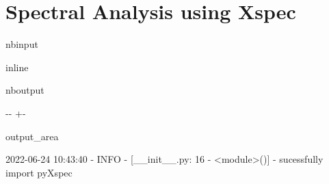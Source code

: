 \documentclass[letterpaper,10pt,english]{sphinxmanual}
\newlength\nbsphinxcodecellspacing
\begin{document}
\section{Spectral Analysis using Xspec}
\label{\detokenize{notebooks/XspecSpectralAnalysis:Spectral-Analysis-using-Xspec}}\label{\detokenize{notebooks/XspecSpectralAnalysis::doc}}
\begin{sphinxuseclass}{nbinput}
{
\begin{sphinxVerbatim}[commandchars=\\\{\}]
\llap{\color{nbsphinxin}[1]:\,\hspace{\fboxrule}\hspace{\fboxsep}}   
   
   
   
   
   
 
 inline
\end{sphinxVerbatim}
}

\end{sphinxuseclass}
\begin{sphinxuseclass}{nboutput}
{

\kern-\sphinxverbatimsmallskipamount\kern-\baselineskip
\kern+\FrameHeightAdjust\kern-\fboxrule
\vspace{\nbsphinxcodecellspacing}

\begin{sphinxuseclass}{output_area}
\begin{sphinxuseclass}{}


\begin{sphinxVerbatim}[commandchars=\\\{\}]
2022-06-24 10:43:40 -    INFO - [\_\_init\_\_.py: 16 -   <module>()] - sucessfully import pyXspec
\end{sphinxVerbatim}



\end{sphinxuseclass}
\end{sphinxuseclass}
}

\end{sphinxuseclass}
\end{document}

